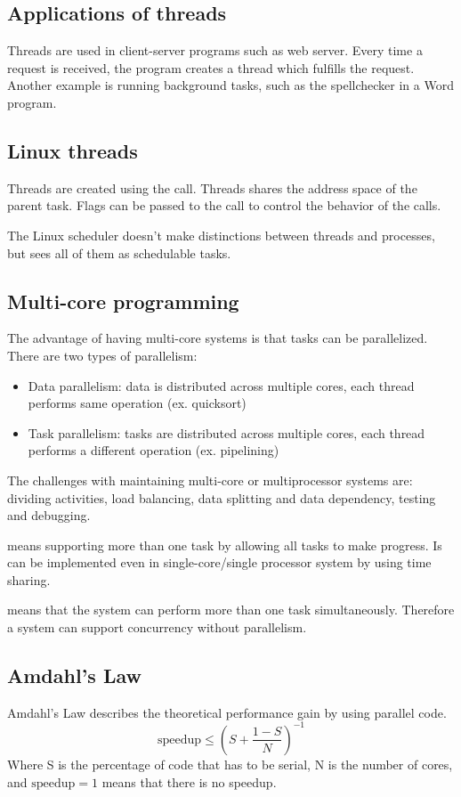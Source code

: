 \subsection{Applications of threads}
Threads are used in client-server programs such as web server. Every time a request is received, the program creates a thread which fulfills the request. Another example is running background tasks, such as the spellchecker in a Word program.

\subsection{Linux threads}
Threads are created using the  call. Threads shares the address space of the parent task. Flags can be passed to the call to control the behavior of the calls.

The Linux scheduler doesn't make distinctions between threads and processes, but sees all of them as schedulable tasks.

\subsection{Multi-core programming}
The advantage of having multi-core systems is that tasks can be parallelized. There are two types of parallelism:
\begin{itemize}
  \item Data parallelism: data is distributed across multiple cores, each thread performs same operation (ex. quicksort)
  \item Task parallelism: tasks are distributed across multiple cores, each thread performs a different operation (ex. pipelining)
\end{itemize}

The challenges with maintaining multi-core or multiprocessor systems are: dividing activities, load balancing, data splitting and data dependency, testing and debugging.

 means supporting more than one task by allowing all tasks to make progress. Is can be implemented even in single-core/single processor system by using time sharing.

 means that the system can perform more than one task simultaneously. Therefore a system can support concurrency without parallelism.

\subsection{Amdahl's Law}
Amdahl's Law describes the theoretical performance gain by using parallel code.
$$ \text{speedup} \le \left (S+\frac{1-S}{N} \right )^{-1} $$
Where S is the percentage of code that has to be serial, N is the number of cores, and $ \text{speedup} = 1 $ means that there is no speedup.

